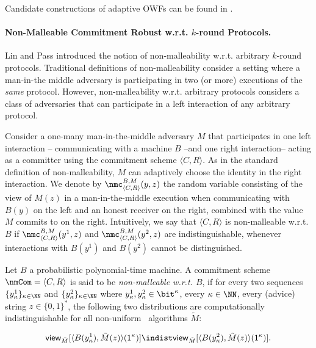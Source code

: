   Candidate constructions of adaptive OWFs can be found in
  \cite{C:PanPasVai08}.

  \paragraph{Non-Malleable Commitment Robust w.r.t. $k$-round Protocols.}
  Lin and Pass \cite{LinPass09} introduced the notion
  of non-malleability w.r.t. arbitrary $k$-round protocols. Traditional
  definitions of non-malleability consider a setting where a man-in-the
  middle adversary is participating in two (or more) executions of the
  \emph{same} protocol. However, non-malleability w.r.t. arbitrary
  protocols considers a class of adversaries that can participate in a
  left interaction of any arbitrary protocol. 


  Consider a one-many man-in-the-middle adversary $M$ that participates
  in one left interaction -- communicating with a machine $B$ --and one
  right interaction-- acting as a committer using the commitment scheme
  $\langle C,R\rangle$.  As in the standard definition of
  non-malleability, $M$ can adaptively choose the identity in the right
  interaction. We denote by $\nmc^{B,M}_{\langle C,R\rangle}(y, z)$ the
  random variable consisting of the view of $M(z)$ in a
  man-in-the-middle execution when communicating with $B(y)$ on the left
  and an honest receiver on the right, combined with the value $M$
  commits to on the right. Intuitively, we say that $\langle C,R\rangle$
  is non-malleable w.r.t. $B$ if $\nmc^{B,M}_{\langle C,R\rangle}(y^1,
  z)$ and $\nmc^{B,M}_{\langle C,R\rangle}(y^2, z)$ are
  indistinguishable, whenever interactions with $B(y^1)$ and $B(y^2)$
  cannot be distinguished.

  \label{def:robust-nmcom} Let $B$
  a probabilistic polynomial-time machine. A commitment scheme
  $\nmCom=\langle C,R\rangle$ is said to be \emph{non-malleable
    w.r.t. $B$}, if for every two sequences $\{y^1_\kappa\}_{\kappa\in
    \NN}$ and $\{y^2_\kappa\}_{\kappa\in \NN}$ where
  $y^1_\kappa,y^2_\kappa\in\bit^\kappa$, every $\kappa\in\NN$, every
  (advice) string $z\in\{0,1\}^{*}$, the following two distributions are
  computationally indistinguishable for all non-uniform \ppt\ algorithms
  $\tilde M$:

  $$\mathsf{view}_{\tilde M}[\langle B(y_\kappa^1),{\tilde
      M}(z)\rangle(1^\kappa)]\indist\mathsf{view}_{\tilde M}[\langle
    B(y_\kappa^2),{\tilde M}(z)\rangle(1^\kappa)].$$

